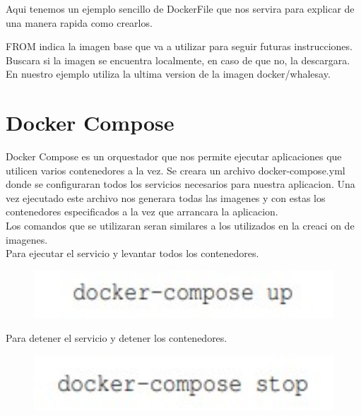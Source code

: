 \documentclass[preprint,12pt]{elsarticle}
\begin{document}
Aqui tenemos un ejemplo sencillo de DockerFile que nos servira para explicar de una manera rapida como crearlos.

FROM indica la imagen base que va a utilizar para seguir futuras instrucciones. Buscara si la imagen se encuentra localmente, en caso de que no, la descargara. En nuestro ejemplo utiliza la ultima version de la imagen docker/whalesay. 

\section{Docker Compose}
Docker Compose es un orquestador que nos permite ejecutar aplicaciones que utilicen varios contenedores a la vez. Se creara un archivo docker-compose.yml donde se configuraran todos los servicios necesarios para nuestra aplicacion. Una vez ejecutado este archivo nos generara todas las imagenes y con estas los contenedores especificados a la 
vez que arrancara la aplicacion.
\\
Los comandos que se utilizaran seran similares a los utilizados en la creaci on de imagenes.
\\
Para ejecutar el servicio y levantar todos los contenedores.

\begin{figure}[htb]
	\begin{center}
		\includegraphics[width=14cm]{./IMAGENES/foto8}
		
	\end{center}
\end{figure}

Para detener el servicio y detener los contenedores.

\begin{figure}[htb]
	\begin{center}
		\includegraphics[width=14cm]{./IMAGENES/foto9}
		
	\end{center}
\end{figure}
\end{document}
